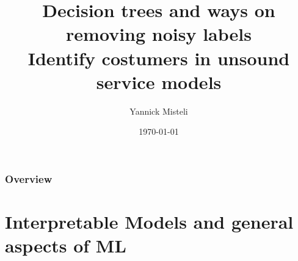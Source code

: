 \documentclass{beamer}\usepackage[]{graphicx}\usepackage[]{color}
\title[decision trees and noisy labels]{%
Decision trees and ways on removing noisy labels\\
  \large Identify costumers in unsound service models}
\author{Yannick Misteli} %
\institute[Julius B{\"a}r] %
{
Julius B{\"a}r \\ %
\medskip
\textit{yannick.misteli@juliusbaer.com} %
}
\date{\today} %
\begin{document}
\begin{frame}[fragile]
\titlepage %



\end{frame}
\begin{frame}[fragile]
\frametitle{Overview} %
\tableofcontents[hideallsubsections] %
\end{frame}
\section{Interpretable Models and general aspects of ML} %
\end{document}
